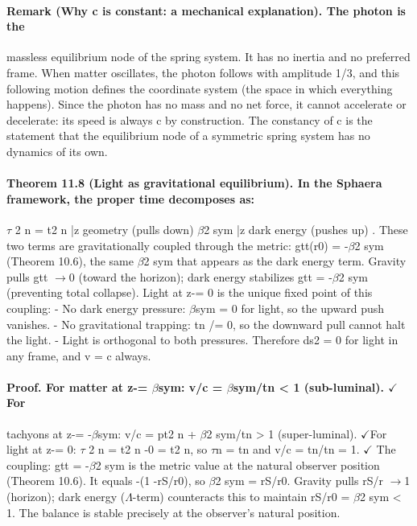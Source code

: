 \documentclass[12pt,a4paper]{article}
\begin{document}
\paragraph*{Remark (Why c is constant: a mechanical explanation). The photon is the}
massless equilibrium node of the spring system. It has no inertia and no preferred frame. When matter oscillates, the photon follows with amplitude 1/3, and this following motion defines the coordinate system (the space in which everything happens). Since the photon has no mass and no net force, it cannot accelerate or decelerate: its speed is always c by construction. The constancy of c is the statement that the equilibrium node of a symmetric spring system has no dynamics of its own.
\paragraph*{Theorem 11.8 (Light as gravitational equilibrium). In the Sphaera framework, the proper time decomposes as:}
$\tau$ 2 n = t2 n |{z} geometry (pulls down) $\beta$2 sym |{z} dark energy (pushes up) . These two terms are gravitationally coupled through the metric: gtt(r0) = -$\beta$2 sym (Theorem 10.6), the same $\beta$2 sym that appears as the dark energy term. Gravity pulls gtt $\to$0 (toward the horizon); dark energy stabilizes gtt = -$\beta$2 sym (preventing total collapse). Light at z-= 0 is the unique fixed point of this coupling:
- No dark energy pressure: $\beta$sym = 0 for light, so the upward push vanishes.
- No gravitational trapping: tn /= 0, so the downward pull cannot halt the
light.
- Light is orthogonal to both pressures.
Therefore ds2 = 0 for light in any frame, and v = c always.
\paragraph*{Proof. For matter at z-= $\beta$sym: v/c = $\beta$sym/tn < 1 (sub-luminal). $\checkmark$For}
tachyons at z-= -$\beta$sym: v/c = pt2 n + $\beta$2 sym/tn > 1 (super-luminal). $\checkmark$For light at z-= 0: $\tau$ 2 n = t2 n -0 = t2 n, so $\tau$n = tn and v/c = tn/tn = 1. $\checkmark$ The coupling: gtt = -$\beta$2 sym is the metric value at the natural observer position (Theorem 10.6). It equals -(1 -rS/r0), so $\beta$2 sym = rS/r0. Gravity pulls rS/r $\to$1 (horizon); dark energy ($\Lambda$-term) counteracts this to maintain rS/r0 = $\beta$2 sym < 1. The balance is stable precisely at the observer's natural position.
\end{document}
